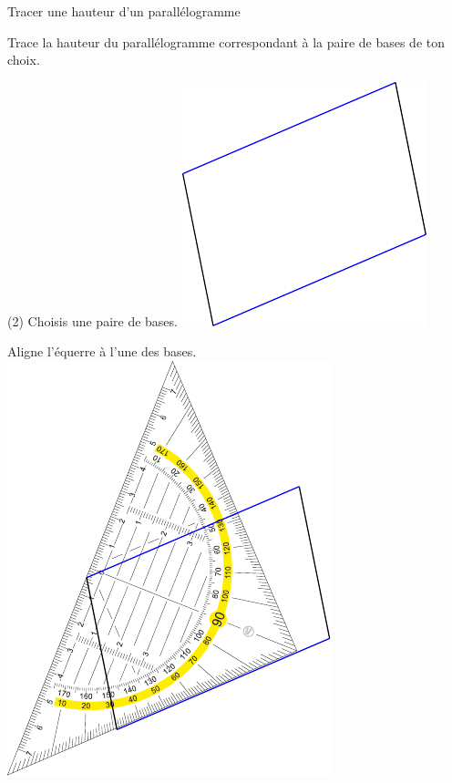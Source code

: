 \documentclass[a4paper,11pt]{report}
\let\oldcenter\center
\let\oldendcenter\endcenter
\renewenvironment{center}{\setlength\topsep{-10pt}\oldcenter}{\oldendcenter}
\begin{document}
\begin{resolu}{Tracer une hauteur d'un parallélogramme}{Trace la hauteur du parallélogramme correspondant à la paire de bases de ton choix.

\begin{tasks}[column-sep=10pt](2)
    \task Choisis une paire de bases. 
    \begin{center} \includegraphics[scale=0.9]{media/gm-01/parallelogramme1} \end{center}

    \task Aligne l'équerre à l'une des bases.
    \begin{center} \includegraphics[scale=.9]{media/gm-01/parallelogramme2bis} \end{center}


\end{tasks}}
\end{resolu}
\end{document}
